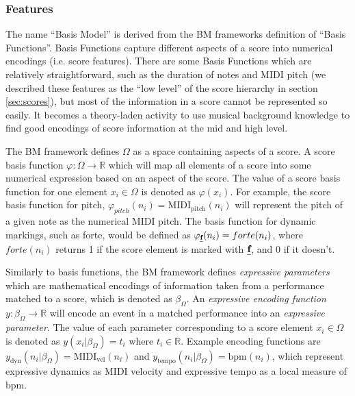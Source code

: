 \subsubsection{Features}
The name ``Basis Model'' is derived from the BM frameworks definition of ``Basis Functions''. Basis Functions capture different aspects of a score into numerical encodings (i.e. score features). There are some Basis Functions which are relatively straightforward, such as the duration of notes and MIDI pitch (we described these features as the ``low level'' of the score hierarchy in section \ref{sec:scores}), but most of the information in a score cannot be represented so easily. It becomes a theory-laden activity to use musical background knowledge to find good encodings of score information at the mid and high level.

\newcommand{\mperf}{\beta_{\Omega}}

The BM framework defines $\Omega$ as a space containing aspects of a score. A score basis function $\varphi: \Omega \rightarrow \mathbb{R}$ which will map all elements of a score into some numerical expression based on an aspect of the score. The value of a score basis function for one element $x_i \in \Omega$ is denoted as $\varphi (x_i)$. For example, the score basis function for pitch, $\varphi_{pitch} (n_i) = \textrm{MIDI}_{\textrm{pitch}}(n_i)$ will represent the pitch of a given note as the numerical MIDI pitch. The basis function for dynamic markings, such as forte, would be defined as $\varphi_{\textbf{\emph{f}}} (n_i) = forte(n_i)$, where $forte(n_i)$ returns 1 if the score element is marked with $\textbf{\emph{f}}$, and 0 if it doesn't. 

Similarly to basis functions, the BM framework defines \emph{expressive parameters} which are mathematical encodings of information taken from a performance matched to a score, which is denoted as $\mperf$. An \emph{expressive encoding function} $y: \mperf \rightarrow \mathbb{R}$ will encode an event in a matched performance into an \emph{expressive parameter}. The value of each parameter corresponding to a score element $x_{i} \in \Omega$ is denoted as $y(x_i \vert \mperf) = t_i$ where $t_i \in \mathbb{R}$. Example encoding functions are $y_{\textrm{dyn}}(n_i \vert \mperf) = \textrm{MIDI}_{\textrm{vel}}(n_i)$ and $y_{\textrm{tempo}}(n_i \vert \mperf) = \textrm{bpm}(n_i)$, which represent expressive dynamics as MIDI velocity and expressive tempo as a local measure of bpm. 


